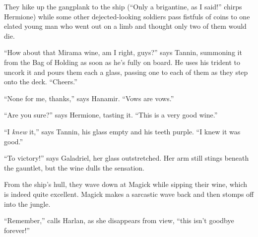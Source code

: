 \documentclass[smalldemyvopaper,11pt,twoside,onecolumn,openright,extrafontsizes]{memoir}
\begin{document}
They hike up the gangplank to the ship (``Only a brigantine, as I
said!'' chirps Hermione) while some other dejected-looking soldiers pass
fistfuls of coins to one elated young man who went out on a limb and
thought only two of them would die.

``How about that Mirama wine, am I right, guys?'' says Tannin, summoning
it from the Bag of Holding as soon as he's fully on board. He uses his
trident to uncork it and pours them each a glass, passing one to each of
them as they step onto the deck. ``Cheers.''

``None for me, thanks,'' says Hanamir. ``Vows are vows.''

``Are you sure?'' says Hermione, tasting it. ``This is a very good
wine.''

``I \emph{knew} it,'' says Tannin, his glass empty and his teeth purple.
``I knew it was good.''

``To victory!'' says Galadriel, her glass outstretched. Her arm still
stings beneath the gauntlet, but the wine dulls the sensation.

From the ship's hull, they wave down at Magick while sipping their wine,
which is indeed quite excellent. Magick makes a sarcastic wave back and
then stomps off into the jungle.

``Remember,'' calls Harlan, as she disappears from view, ``this isn't
goodbye forever!''
\end{document}
